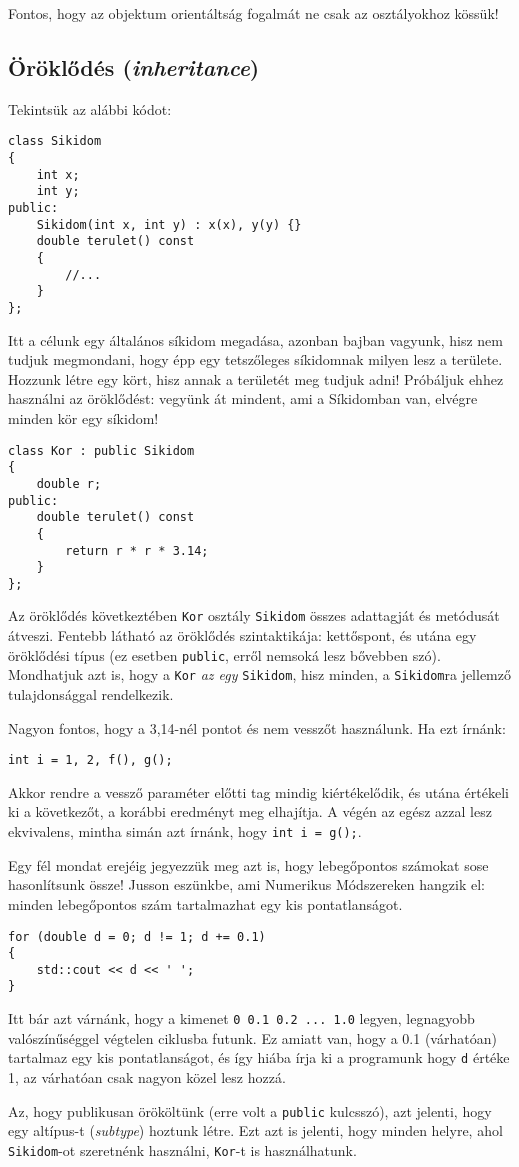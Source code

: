 \documentclass[a4paper,11.5pt]{article}
\begin{document}
	Fontos, hogy az objektum orientáltság fogalmát ne csak az osztályokhoz kössük!
	
	\subsection{Öröklődés (\textit{inheritance})}
	Tekintsük az alábbi kódot:
	\begin{lstlisting}
class Sikidom
{
	int x;
	int y;
public:
	Sikidom(int x, int y) : x(x), y(y) {}
	double terulet() const
	{
		//...
	}
};
	\end{lstlisting}
	Itt a célunk egy általános síkidom megadása, azonban bajban vagyunk, hisz nem tudjuk megmondani, hogy épp egy tetszőleges síkidomnak milyen lesz a területe. Hozzunk létre egy kört, hisz annak a területét meg tudjuk adni! Próbáljuk ehhez használni az öröklődést: vegyünk át mindent, ami a Síkidomban van, elvégre minden kör egy síkidom!
	
	\begin{lstlisting}
class Kor : public Sikidom
{
	double r;
public:
	double terulet() const
	{
		return r * r * 3.14;
	}
};
	\end{lstlisting}
	Az öröklődés következtében \texttt{Kor} osztály \texttt{Sikidom} összes adattagját és metódusát átveszi. Fentebb látható az öröklődés szintaktikája: kettőspont, és utána egy öröklődési típus (ez esetben \texttt{public}, erről nemsoká lesz bővebben szó). Mondhatjuk azt is, hogy a \texttt{Kor} \textit{az egy} \texttt{Sikidom}, hisz minden, a \texttt{Sikidom}ra jellemző tulajdonsággal rendelkezik.
	\begin{note}
		Nagyon fontos, hogy a 3,14-nél pontot és nem vesszőt használunk. Ha ezt írnánk:
		\begin{lstlisting}
int i = 1, 2, f(), g();
		\end{lstlisting}
		
		Akkor rendre a vessző paraméter előtti tag mindig kiértékelődik, és utána értékeli ki a következőt, a korábbi eredményt meg elhajítja. A végén az egész azzal lesz ekvivalens, mintha simán azt írnánk, hogy \texttt{int i = g();}.
		
		Egy fél mondat erejéig jegyezzük meg azt is, hogy lebegőpontos számokat sose hasonlítsunk össze! Jusson eszünkbe, ami Numerikus Módszereken hangzik el: minden lebegőpontos szám tartalmazhat egy kis pontatlanságot.
		\begin{lstlisting}
for (double d = 0; d != 1; d += 0.1)
{
	std::cout << d << ' ';
}
		\end{lstlisting}
		Itt bár azt várnánk, hogy a kimenet \texttt{0 0.1 0.2 ... 1.0} legyen, legnagyobb valószínűséggel végtelen ciklusba futunk. Ez amiatt van, hogy a 0.1 (várhatóan) tartalmaz egy kis pontatlanságot, és így hiába írja ki  a programunk hogy \texttt{d} értéke 1, az várhatóan csak nagyon közel lesz hozzá.
	\end{note}
	Az, hogy publikusan örököltünk (erre volt a \texttt{public} kulcsszó), azt jelenti, hogy egy {altípus}-t (\textit{subtype}) hoztunk létre. 
	Ezt azt is jelenti, hogy minden helyre, ahol \texttt{Sikidom}-ot szeretnénk használni, \texttt{Kor}-t is használhatunk.
	
\end{document}
